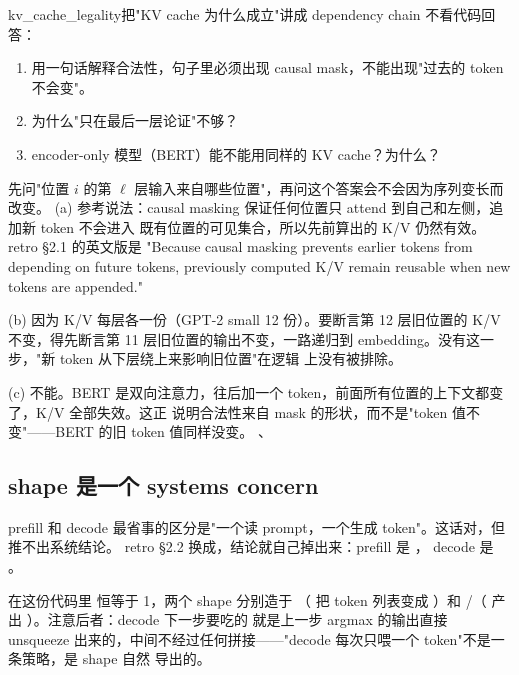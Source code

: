 \begin{checkpoint}{kv_cache_legality}{把"KV cache 为什么成立"讲成 dependency chain}
不看代码回答：
\begin{enumerate}[label=(\alph*)]
  \item 用一句话解释合法性，句子里必须出现 causal mask，不能出现"过去的 token 不会变"。
  \item 为什么"只在最后一层论证"不够？
  \item encoder-only 模型（BERT）能不能用同样的 KV cache？为什么？
\end{enumerate}
\hint 先问"位置 $i$ 的第 $\ell$ 层输入来自哪些位置"，再问这个答案会不会因为序列变长而改变。
\ifshowanswers
\tcblower
\answer (a) 参考说法：causal masking 保证任何位置只 attend 到自己和左侧，追加新 token 不会进入
既有位置的可见集合，所以先前算出的 K/V 仍然有效。retro §2.1 的英文版是 "Because causal masking
prevents earlier tokens from depending on future tokens, previously computed K/V remain reusable
when new tokens are appended."

(b) 因为 K/V 每层各一份（GPT-2 small 12 份）。要断言第 12 层旧位置的 K/V 不变，得先断言第 11
层旧位置的输出不变，一路递归到 embedding。没有这一步，"新 token 从下层绕上来影响旧位置"在逻辑
上没有被排除。

(c) 不能。BERT 是双向注意力，往后加一个 token，前面所有位置的上下文都变了，K/V 全部失效。这正
说明合法性来自 mask 的形状，而不是"token 值不变"——BERT 的旧 token 值同样没变。
\whereincode {}、
\fi
\end{checkpoint}

\subsection{shape 是一个 systems concern}
\label{sec:a-loop-shape}

prefill 和 decode 最省事的区分是"一个读 prompt，一个生成 token"。这话对，但推不出系统结论。
retro §2.2 换成，结论就自己掉出来：prefill 是 ，
decode 是 \code{[batch, 1]}。

在这份代码里  恒等于 1，两个 shape 分别造于
（ 把 token 列表变成
）和 /（ 产出
）。注意后者：decode 下一步要吃的 \code{[B,1]} 就是上一步 argmax 的输出直接
unsqueeze 出来的，中间不经过任何拼接——"decode 每次只喂一个 token"不是一条策略，是 shape 自然
导出的。

